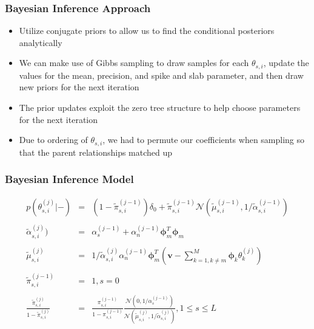 \documentclass{beamer}
\begin{document}
\begin{frame}
  \frametitle{Bayesian Inference Approach}
  \begin{itemize}
  \item Utilize conjugate priors to allow us to find the conditional
    posteriors analytically
  \item We can make use of Gibbs sampling to draw samples for each
    $\theta_{s,i}$, update the values for the mean, precision, and
    spike and slab parameter, and then draw new priors for the next iteration
  \item The prior updates exploit the zero tree structure to help
    choose parameters for the next iteration
  \item Due to ordering of $\theta_{s,i}$, we had to permute our
    coefficients when sampling so that the parent relationships
    matched up
   \end{itemize}
\end{frame}

\begin{frame}
  \frametitle{Bayesian Inference Model}
  \[       \begin{array}{ccc}
    p(\theta_{s,i}^{(j)}|-) & = &
    (1-\tilde{\pi}_{s,i}^{(j-1)})\delta_0+\tilde{\pi}_{s,i}^{(j-1)}\mathcal{N}(\tilde{\mu}_{s,i}^{(j-1)},1/\tilde{\alpha}_{s,i}^{(j-1)})
    \\
    & & \\
    \tilde{\alpha}_{s,i}^{(j)}) & = & \alpha_s^{(j-1)} + \alpha_n^{(j-1)}
    \mathbf{\phi}_m^T\mathbf{\phi}_m \\
    & & \\
    \tilde{\mu}_{s,i}^{(j)} & = &
    1/\tilde{\alpha}_{s,i}^{(j)}\alpha_n^{(j-1)}\mathbf{\phi}_m^T(\mathbf{v}-\sum_{k=1,k\neq
      m}^M\mathbf{\phi}_k\theta_k^{(j)}) \\
    & & \\
    \tilde{\pi}_{s,i}^{(j-1)} & = & 1, s = 0 \\
    & & \\
    \frac{\tilde{\pi}_{s,i}^{(j)}}{1-\tilde{\pi}_{s,i}^{(j)}} & =
    &
    \frac{\pi_{s,i}^{(j-1)}}{1-\pi_{s,i}^{(j-1)}}\frac{\mathcal{N}(0,1/\alpha_s^{(j-1)})}{\mathcal{N}(\tilde{\mu}_{s,i}^{(j)},1/\tilde{\alpha}_{s,i}^{(j)})},
    1 \leq s \leq L \\
  \end{array}
  \]
\end{frame}
\end{document}
